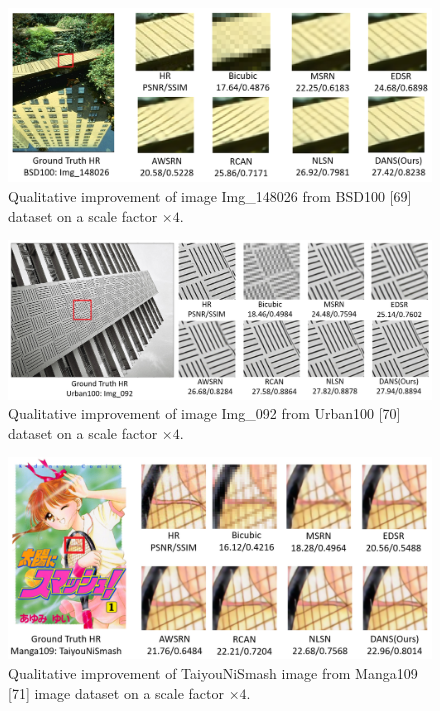 \documentclass{ieeeaccess}
\begin{document}
\begin{figure}
    \centering

    \includegraphics[width=\linewidth]{19Figure.png}
    \caption{Qualitative improvement of image Img\_148026 from BSD100 [69] dataset on a scale factor $\times4$.}
    \label{fig:19}
\end{figure}

\begin{figure}
    \centering

    \includegraphics[width=\linewidth]{20Figure.png}
    \caption{Qualitative improvement of image Img\_092 from Urban100 [70] dataset on a scale factor $\times4$.}
    \label{fig:20}
\end{figure}


\begin{figure}
    \centering

    \includegraphics[width=\linewidth]{21Figure.png}
    \caption{Qualitative improvement of TaiyouNiSmash image from Manga109 [71] image dataset on a scale factor $\times4$.}
    \label{fig:21}
\end{figure}
\end{document}

